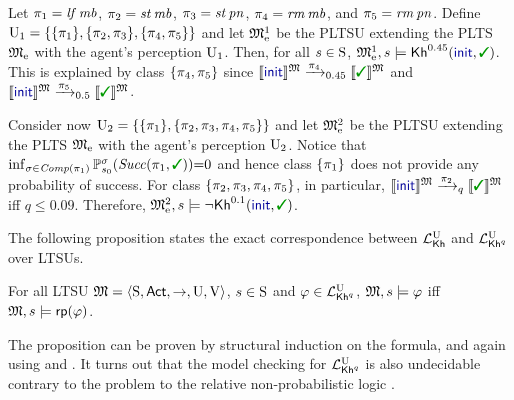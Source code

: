 \begin{example}\label{ex:running:pkhunc}
  Let
  $\plan_1 = \lift\,\mobile$, $\plan_2 = \stairs\,\mobile$,
  $\plan_3 = \stairs\,\panic$, $\plan_4 = \ramp\,\mobile$, and
  $\plan_5 = \ramp\,\panic$.
  Define
  $\Unc_1 = \{ \{\plan_1\}, \{\plan_2,\plan_3\}, \{\plan_4,\plan_5\}\}$
  and let $\modelex^1$ be the PLTSU extending the PLTS $\modelex$ with
  the agent's perception $\Unc_1$.
  Then, for all $s\in\S$,
  $\modelex^1,s \models \kh^{0.45}(\init,\goal)$.
  This is explained by class $\{\plan_4,\plan_5\}$ since
  $\truthset{\model}{\init}\reach{\plan_4}_{0.45}\truthset{\model}{\goal}$
  and
  $\truthset{\model}{\init}\reach{\plan_5}_{0.5}\truthset{\model}{\goal}$.

  Consider now
  $\Unc_2 = \{ \{\plan_1\}, \{\plan_2,\plan_3,\plan_4,\plan_5\}\}$
  and let $\modelex^2$ be the PLTSU extending the PLTS $\modelex$ with
  the agent's perception $\Unc_2$.
  Notice that
  $\inf_{\strat\in\Comp(\plan_1)}\Prob^\strat_{s_0}(\Succ(\plan_1,\goal)){=}0$
  and hence class $\{\plan_1\}$ does not provide any probability of
  success.
  For class $\{\plan_2,\plan_3,\plan_4,\plan_5\}$, in particular,
  $\truthset{\model}{\init}\reach{\plan_2}_q\truthset{\model}{\goal}$
  iff $q\leq 0.09$.
  Therefore, $\modelex^2, s \models \neg \kh^{0.1}(\init,\goal)$.
\end{example}


%
The following proposition states the exact correspondence between
$\Khunc$ and $\PKhunc$ over LTSUs.
%
%
\begin{proposition}\label{prop:Khunc:PKhunc}
    For all LTSU $\model = \tup{\S,\Act,\ra,\Unc,\V}$, $s\in\S$ and
    $\varphi\in\PKhunc$,
    $\model,s\models\varphi$ iff $\model,s\models\fgetprob(\varphi)$.
\end{proposition}

The proposition can be proven by structural induction on
the formula, and again using  and .
It turns out that the model checking for $\PKhunc$ is also undecidable
contrary to the \PTIME problem to the relative non-probabilistic logic
\cite{DF23}.



